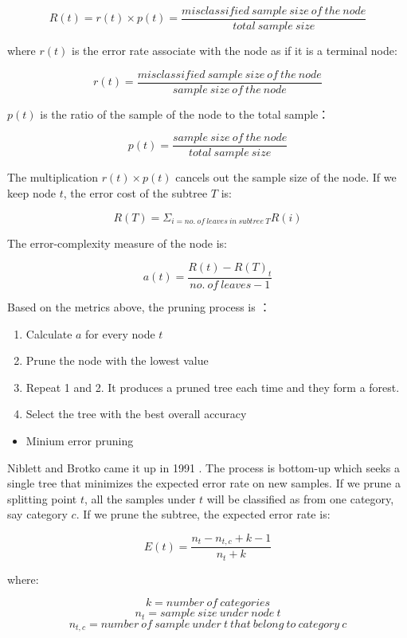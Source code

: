 \documentclass[12pt,]{krantz}
\providecommand{\tightlist}{%
  \setlength{\itemsep}{0pt}\setlength{\parskip}{0pt}}
\begin{document}
\[R(t)=r(t)\times p(t) = \frac{misclassified\ sample\ size\ of\ the\ node}{total\ sample\ size}\]

where \(r(t)\) is the error rate associate with the node as if it is a terminal node:

\[r(t)=\frac{misclassified\ sample\ size\ of\ the\ node}{sample\ size\ of\ the\ node}\]

\(p(t)\) is the ratio of the sample of the node to the total sample：

\[p(t)=\frac{ sample\ size\ of\ the\ node}{total\ sample\ size}\]

The multiplication \(r(t)\times p(t)\) cancels out the sample size of the node. If we keep node \(t\), the error cost of the subtree \(T\) is:

\[R(T)=\Sigma_{i = no.\ of\ leaves\ in\ subtree\ T} R(i)\]

The error-complexity measure of the node is:

\[a(t)=\frac{R(t)-R(T)_{t}}{no.\ of\ leaves - 1}\]

Based on the metrics above, the pruning process is \citep{Nikita2012}：

\begin{enumerate}
\def\labelenumi{\arabic{enumi}.}
\tightlist
\item
  Calculate \(a\) for every node \(t\)
\item
  Prune the node with the lowest value
\item
  Repeat 1 and 2. It produces a pruned tree each time and they form a forest.
\item
  Select the tree with the best overall accuracy
\end{enumerate}

\begin{itemize}
\tightlist
\item
  Minium error pruning
\end{itemize}

Niblett and Brotko came it up in 1991 \citep{Cestnik1991}. The process is bottom-up which seeks a single tree that minimizes the expected error rate on new samples. If we prune a splitting point \(t\), all the samples under \(t\) will be classified as from one category, say category \(c\). If we prune the subtree, the expected error rate is:

\[E(t)=\frac{n_{t}-n_{t,c}+k-1}{n_{t}+k}\]

where:

\[k=number\ of\ categories\]
\[n_{t}=sample\ size\ under\ node\ t\]
\[n_{t,c}= number\ of\ sample\ under\ t\ that\ belong\ to\ category\ c\]
\end{document}
